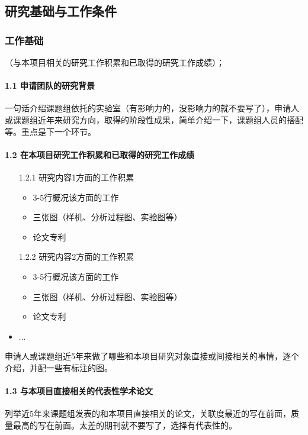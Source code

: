 \subsection{研究基础与工作条件}
\subsubsection{工作基础}
（与本项目相关的研究工作积累和已取得的研究工作成绩）；
\paragraph{1.1 申请团队的研究背景}
一句话介绍课题组依托的实验室（有影响力的，没影响力的就不要写了），申请人或课题组近年来研究方向，取得的阶段性成果，简单介绍一下，课题组人员的搭配等。重点是下一个环节。

\paragraph{1.2 在本项目研究工作积累和已取得的研究工作成绩}
\begin{itemize}
\item[1.2.1] 研究内容1方面的工作积累
	\begin{itemize}
	\item 3-5行概况该方面的工作
	\item 三张图（样机、分析过程图、实验图等）
	\item 论文专利
	\end{itemize}
	
\item[1.2.2] 研究内容2方面的工作积累
	\begin{itemize}
	\item 3-5行概况该方面的工作
	\item 三张图（样机、分析过程图、实验图等）
	\item 论文专利
	\end{itemize}
	
\item ...
\end{itemize}
申请人或课题组近5年来做了哪些和本项目研究对象直接或间接相关的事情，逐个介绍，并配一些有标注的图。


\paragraph{1.3 与本项目直接相关的代表性学术论文}
列举近5年来课题组发表的和本项目直接相关的论文，关联度最近的写在前面，质量最高的写在前面。太差的期刊就不要写了，选择有代表性的。


